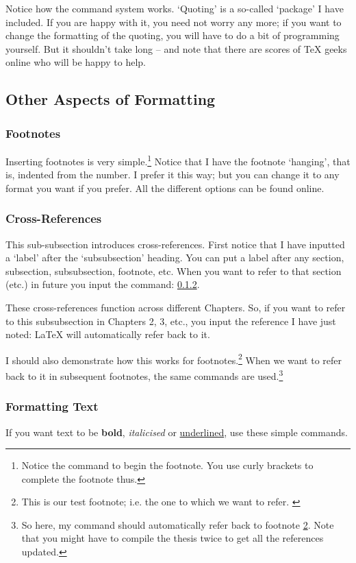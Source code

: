 Notice how the command system works. `Quoting' is a so-called `package' I have included. If you are happy with it, you need not worry any more; if you want to change the formatting of the quoting, you will have to do a bit of programming yourself. But it shouldn't take long -- and note that there are scores of TeX geeks online who will be happy to help.

\subsection{Other Aspects of Formatting}
\subsubsection{Footnotes}
Inserting footnotes is very simple.\footnote{Notice the command to begin the footnote. You use curly brackets to complete the footnote thus.} Notice that I have the footnote `hanging', that is, indented from the number. I prefer it this way; but you can change it to any format you want if you prefer. All the different options can be found online. 

\subsubsection{Cross-References}
\label{cross-references}
This sub-subsection introduces cross-references. First notice that I have inputted a `label' after the `subsubsection' heading. You can put a label after any section, subsection, subsubsection, footnote, etc. When you want to refer to that section (etc.) in future you input the command: \ref{cross-references}.

These cross-references function across different Chapters. So, if you want to refer to this subsubsection in Chapters 2, 3, etc., you input the reference I have just noted: LaTeX will automatically refer back to it. 

I should also demonstrate how this works for footnotes.\footnote{This is our test footnote; i.e. the one to which we want to refer. \label{test footnote}} When we want to refer back to it in subsequent footnotes, the same commands are used.\footnote{So here, my command should automatically refer back to footnote \ref{test footnote}. Note that you might have to compile the thesis twice to get all the references updated.}

\subsubsection{Formatting Text}
If you want text to be \textbf{bold}, \emph{italicised} or \underline{underlined}, use these simple commands. 

